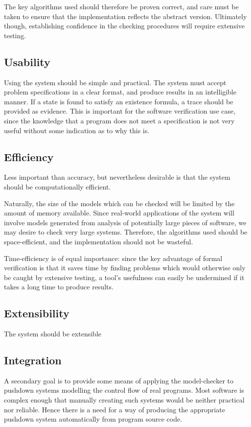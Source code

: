 \documentclass[11pt]{article}
\theoremstyle{definition}
\begin{document}
The key algorithms used should therefore be proven correct, and care must be
taken to ensure that the implementation reflects the abstract version.
Ultimately though, establishing confidence in the checking procedures will
require extensive testing.

\subsection{Usability}

Using the system should be simple and practical.  The system must accept
problem specifications in a clear format, and produce results in an
intelligible manner.  If a state is found to satisfy an existence formula, a
trace should be provided as evidence.  This is important for the software
verification use case, since the knowledge that a program does not meet a
specification is not very useful without some indication as to why this is.

\subsection{Efficiency}

Less important than accuracy, but nevertheless desirable is that the system
should be computationally efficient. 

Naturally, the size of the models which can be checked will be limited by the
amount of memory available. Since real-world applications of the system will
involve models generated from analysis of potentially large pieces of software,
we may desire to check very large systems. Therefore, the algorithms used
should be space-efficient, and the implementation should not be wasteful.

Time-efficiency is of equal importance: since the key advantage of formal
verification is that it saves time by finding problems which would otherwise
only be caught by extensive testing, a tool's usefulness can easily be
undermined if it takes a long time to produce results.

\subsection{Extensibility}

The system should be extensible

\subsection{Integration}
A secondary goal is to provide some means of applying the model-checker to
pushdown systems modelling the control flow of real programs. Most software is
complex enough that manually creating such systems would be neither practical
nor reliable. Hence there is a need for a way of producing the appropriate
pushdown system automatically from program source code.
\end{document}
